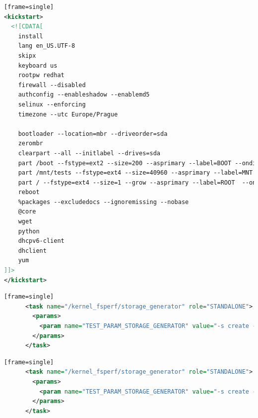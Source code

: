 \documentclass[
  color, %
  table, %
  lof,   %
  lot,   %
]{fithesis3}
\begin{document}
\begin{lstlisting}[language=xml, caption={Configuring environment using kickstart}][frame=single]
<kickstart>
  <![CDATA[
    install
    lang en_US.UTF-8
    skipx
    keyboard us
    rootpw redhat
    firewall --disabled
    authconfig --enableshadow --enablemd5
    selinux --enforcing
    timezone --utc Europe/Prague

    bootloader --location=mbr --driveorder=sda
    zerombr
    clearpart --all --initlabel --drives=sda
    part /boot --fstype=ext2 --size=200 --asprimary --label=BOOT --ondisk=sda
    part /mnt/tests --fstype=ext4 --size=40960 --asprimary --label=MNT --ondisk=sda
    part / --fstype=ext4 --size=1 --grow --asprimary --label=ROOT  --ondisk=sda
    reboot
    %packages --excludedocs --ignoremissing --nobase
    @core
    wget
    python
    dhcpv6-client
    dhclient
    yum
]]>
</kickstart>
\end{lstlisting}

\begin{lstlisting}[language=xml, caption={Executing task and passing arguments}][frame=single]
      <task name="/kernel_fsperf/storage_generator" role="STANDALONE">
        <params>
          <param name="TEST_PARAM_STORAGE_GENERATOR" value="-s create -f ext4 -t single -m /RHTSspareLUN1 -d /dev/sdc -T 1SASHDD_ext4"/>
        </params>
      </task>
\end{lstlisting}

\begin{lstlisting}[language=xml, caption={Configuring storage using storage generator in beaker environment}][frame=single]
      <task name="/kernel_fsperf/storage_generator" role="STANDALONE">
        <params>
          <param name="TEST_PARAM_STORAGE_GENERATOR" value="-s create -f xfs -t lvm -m /RHTSspareLUN1 -r jokerlvm -T 2SATASSDLVM_xfs"/>
        </params>
      </task>
\end{lstlisting}
\end{document}
